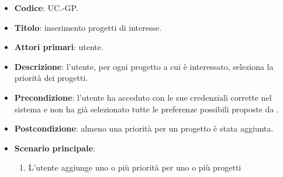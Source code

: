     \begin{itemize}
        \item \textbf{Codice}: UC\theuccount.\thesubuccount-GP.
        \item \textbf{Titolo}: inserimento progetti di interesse.
        \item \textbf{Attori primari}: utente.
        \item \textbf{Descrizione}: l'utente, per ogni progetto a cui è interessato, seleziona la priorità dei progetti.
        \item \textbf{Precondizione}: l’utente ha acceduto con le sue credenziali corrette nel sistema e non ha già selezionato tutte le preferenze possibili proposte da \progetto.
        \item \textbf{Postcondizione}: almeno una priorità per un progetto è stata aggiunta.
        \item \textbf{Scenario principale}:
        \begin{enumerate}
            \item L'utente aggiunge uno o più priorità per uno o più progetti
        \end{enumerate}
    \end{itemize}